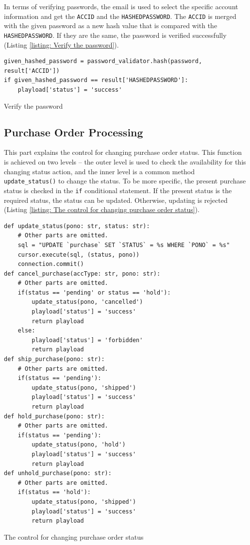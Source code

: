 \documentclass{article}
\begin{document}
\newpage
\leavevmode
\\\\
In terms of verifying passwords, the email is used to select the specific account information and get the \verb|ACCID| and the \verb|HASHEDPASSWORD|. The \verb|ACCID| is merged with the given password as a new hash value that is compared with the \verb|HASHEDPASSWORD|. If they are the same, the password is verified successfully (Listing \ref{listing: Verify the password}).
\begin{listing}[!htp]
\begin{verbatim}
given_hashed_password = password_validator.hash(password, result['ACCID'])
if given_hashed_password == result['HASHEDPASSWORD']:
    playload['status'] = 'success'
\end{verbatim}
\caption{Verify the password}
\label{listing: Verify the password}
\end{listing}
\subsection{Purchase Order Processing}
This part explains the control for changing purchase order status. This function is achieved on two levels – the outer level is used to check the availability for this changing status action, and the inner level is a common method \verb|update_status()| to change the status. To be more specific, the present purchase status is checked in the \verb|if| conditional statement. If the present status is the required status, the status can be updated. Otherwise, updating is rejected (Listing \ref{listing: The control for changing purchase order status}).
\begin{listing}[!htp]
\begin{verbatim}
def update_status(pono: str, status: str):
    # Other parts are omitted.
    sql = "UPDATE `purchase` SET `STATUS` = %s WHERE `PONO` = %s"
    cursor.execute(sql, (status, pono))
    connection.commit()
def cancel_purchase(accType: str, pono: str):
    # Other parts are omitted.
    if(status == 'pending' or status == 'hold'):
        update_status(pono, 'cancelled')
        playload['status'] = 'success'
        return playload
    else:
        playload['status'] = 'forbidden'
        return playload
def ship_purchase(pono: str):
    # Other parts are omitted.
    if(status == 'pending'):
        update_status(pono, 'shipped')
        playload['status'] = 'success'
        return playload
def hold_purchase(pono: str):
    # Other parts are omitted.
    if(status == 'pending'):
        update_status(pono, 'hold')
        playload['status'] = 'success'
        return playload
def unhold_purchase(pono: str):
    # Other parts are omitted.
    if(status == 'hold'):
        update_status(pono, 'shipped')
        playload['status'] = 'success'
        return playload
\end{verbatim}
\caption{The control for changing purchase order status}
\label{listing: The control for changing purchase order status}
\end{listing}
\clearpage
\end{document}

